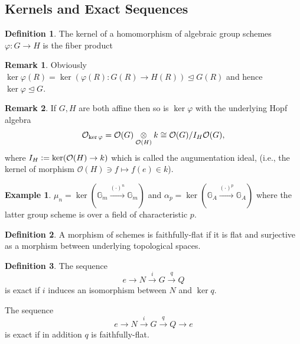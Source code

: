 \documentclass[10pt]{article}
\numberwithin{equation}{section}
\theoremstyle{definition}
\newtheorem{definition}{Definition}[section]
\newtheorem{remark}{Remark}[section]
\newtheorem{example}{Example}[section]
\newcommand{\defeq}{\vcentcolon=}
\newcommand{\G}[0]{\mathbb{G}}
\newcommand{\cO}[0]{\mathcal{O}}
\newcommand{\fib}[1]{%
  \mathbin{\mathop{\times}\limits_{#1}}%
}
\newcommand{\tens}[1]{%
  \mathbin{\mathop{\otimes}\displaylimits_{#1}}%
}
\begin{document}

\subsection{Kernels and Exact Sequences}

\begin{definition}
    \label{definition_21}
    The kernel of a homomorphism of algebraic group schemes $\varphi:G\to H$ is the fiber product 
    \begin{center}
    \end{center}
\end{definition}

\begin{remark}
    Obviously $\ker\varphi(R)=\ker(\varphi(R):G(R)\to H(R))\trianglelefteq G(R)$ and hence $\ker\varphi\trianglelefteq G$.
\end{remark}

\begin{remark}
    If $G,H$ are both affine then so is $\ker\varphi$ with the underlying Hopf algebra 
    \begin{equation*}
        \cO_{\ker\varphi} = \cO(G)\tens{\cO(H)}k\cong \cO(G)/I_H\cO(G),
    \end{equation*}
    where $I_H \defeq \ker(\cO(H)\to k)$ which is called the augumentation ideal, (i.e., the kernel of morphism $\cO(H)\ni f\mapsto f(e)\in k$).
\end{remark}

\begin{example}
    $\mu_n = \ker(\G_m\stackrel{(\cdot)^n}{\to}\G_m)$ and $\alpha_p = \ker(\G_A\stackrel{(\cdot)^p}{\to}\G_A)$ where the latter group scheme is over a field of characteristic $p$.
\end{example}

\begin{definition}
    A morphism of schemes is faithfully-flat if it is flat and surjective as a morphism between underlying topological spaces.
\end{definition}

\begin{definition}
    \label{definition_23}
    The sequence 
    \begin{equation*}
        e\to N\stackrel{i}{\to}G\stackrel{q}{\to}Q
    \end{equation*}
    is exact if $i$ induces an isomorphism between $N$ and $\ker q$.
    \par The sequence 
    \begin{equation*}
        e\to N\stackrel{i}{\to}G\stackrel{q}{\to}Q\to e
    \end{equation*}
    is exact if in addition $q$ is faithfully-flat.
\end{definition}
\end{document}
